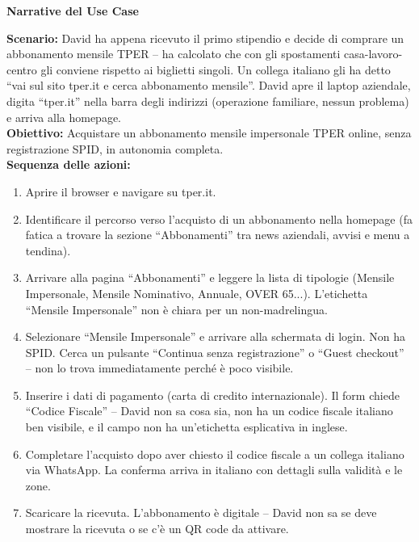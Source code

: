 \documentclass[11pt,a4paper]{article}
\begin{document}
\begin{tcolorbox}[colback=backgroundColor,colframe=borderColor,arc=2mm]
    \textbf{Narrative del Use Case} \\[4pt]
    {\small
    \textbf{Scenario:} David ha appena ricevuto il primo stipendio e decide di comprare un abbonamento mensile TPER -- ha calcolato che con gli spostamenti casa-lavoro-centro gli conviene rispetto ai biglietti singoli. Un collega italiano gli ha detto ``vai sul sito tper.it e cerca abbonamento mensile''. David apre il laptop aziendale, digita ``tper.it'' nella barra degli indirizzi (operazione familiare, nessun problema) e arriva alla homepage. \\[4pt]

    \textbf{Obiettivo:} Acquistare un abbonamento mensile impersonale TPER online, senza registrazione SPID, in autonomia completa. \\[4pt]

    \textbf{Sequenza delle azioni:}
    \begin{enumerate}
        \item Aprire il browser e navigare su tper.it.
        \item Identificare il percorso verso l'acquisto di un abbonamento nella homepage (fa fatica a trovare la sezione ``Abbonamenti'' tra news aziendali, avvisi e menu a tendina).
        \item Arrivare alla pagina ``Abbonamenti'' e leggere la lista di tipologie (Mensile Impersonale, Mensile Nominativo, Annuale, OVER 65...). L'etichetta ``Mensile Impersonale'' non \`e chiara per un non-madrelingua.
        \item Selezionare ``Mensile Impersonale'' e arrivare alla schermata di login. Non ha SPID. Cerca un pulsante ``Continua senza registrazione'' o ``Guest checkout'' -- non lo trova immediatamente perch\'e \`e poco visibile.
        \item Inserire i dati di pagamento (carta di credito internazionale). Il form chiede ``Codice Fiscale'' -- David non sa cosa sia, non ha un codice fiscale italiano ben visibile, e il campo non ha un'etichetta esplicativa in inglese.
        \item Completare l'acquisto dopo aver chiesto il codice fiscale a un collega italiano via WhatsApp. La conferma arriva in italiano con dettagli sulla validit\`a e le zone.
        \item Scaricare la ricevuta. L'abbonamento \`e digitale -- David non sa se deve mostrare la ricevuta o se c'\`e un QR code da attivare.
    \end{enumerate}

}
\end{tcolorbox}
\end{document}
